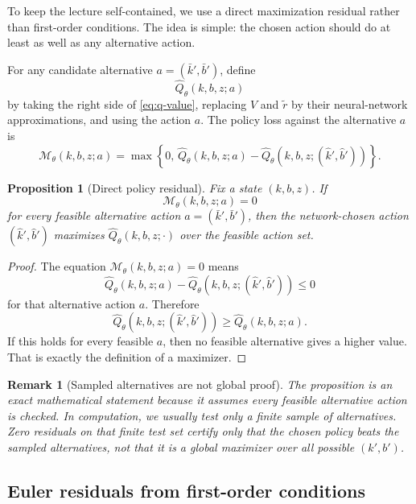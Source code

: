 \documentclass[11pt]{article}
\newtheorem{proposition}{Proposition}
\newtheorem{remark}{Remark}
\newcommand{\1}{\mathbf{1}}
\begin{document}
To keep the lecture self-contained, we use a direct maximization residual rather
than first-order conditions. The idea is simple: the chosen action should do at
least as well as any alternative action.

For any candidate alternative \(a=(\bar k',\bar b')\), define
\[
  \widehat Q_\theta(k,b,z;a)
\]
by taking the right side of \cref{eq:q-value}, replacing \(V\) and
\(\widetilde r\) by their neural-network approximations, and using the action
\(a\). The policy loss against the alternative \(a\) is
\begin{equation}
  \mathcal M_\theta(k,b,z;a)
  =
  \max\left\{
    0,\,
    \widehat Q_\theta(k,b,z;a)
    -
    \widehat Q_\theta(k,b,z;(\widehat k',\widehat b'))
  \right\}.
  \label{eq:policy-residual}
\end{equation}

\begin{proposition}[Direct policy residual]
\label{prop:direct-policy-loss}
Fix a state \((k,b,z)\). If
\[
  \mathcal M_\theta(k,b,z;a)=0
\]
for every feasible alternative action \(a=(\bar k',\bar b')\), then the
network-chosen action \((\widehat k',\widehat b')\) maximizes
\(\widehat Q_\theta(k,b,z;\cdot)\) over the feasible action set.
\end{proposition}

\begin{proof}
The equation \(\mathcal M_\theta(k,b,z;a)=0\) means
\[
  \widehat Q_\theta(k,b,z;a)
  -
  \widehat Q_\theta(k,b,z;(\widehat k',\widehat b'))
  \le 0
\]
for that alternative action \(a\). Therefore
\[
  \widehat Q_\theta(k,b,z;(\widehat k',\widehat b'))
  \ge
  \widehat Q_\theta(k,b,z;a).
\]
If this holds for every feasible \(a\), then no feasible alternative gives a
higher value. That is exactly the definition of a maximizer.
\end{proof}

\begin{remark}[Sampled alternatives are not global proof]
The proposition is an exact mathematical statement because it assumes every
feasible alternative action is checked. In computation, we usually test only a
finite sample of alternatives. Zero residuals on that finite test set certify
only that the chosen policy beats the sampled alternatives, not that it is a
global maximizer over all possible \((k',b')\).
\end{remark}

\subsection{Euler residuals from first-order conditions}
\label{subsec:euler-residuals}
\end{document}
